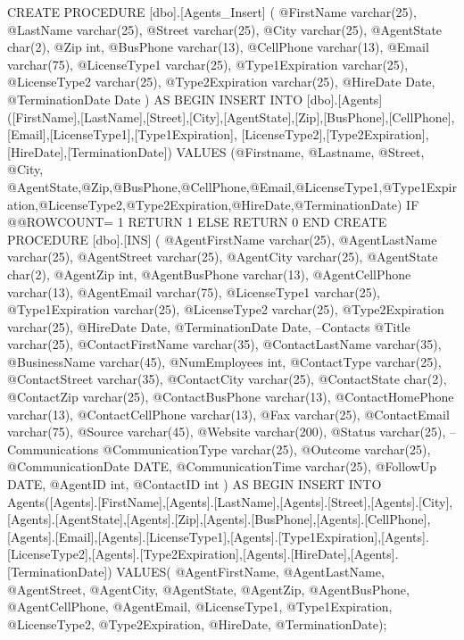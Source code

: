 CREATE PROCEDURE [dbo].[Agents_Insert]
(	
	@FirstName varchar(25),
	@LastName varchar(25),
	@Street varchar(25),
	@City varchar(25),
	@AgentState char(2),
	@Zip int,
	@BusPhone varchar(13),
	@CellPhone varchar(13),
	@Email varchar(75),
	@LicenseType1 varchar(25),
	@Type1Expiration varchar(25),
	@LicenseType2 varchar(25),
	@Type2Expiration varchar(25),
	@HireDate Date,
	@TerminationDate Date
) AS BEGIN
INSERT INTO [dbo].[Agents]
			([FirstName],[LastName],[Street],[City],[AgentState],[Zip],[BusPhone],[CellPhone],[Email],[LicenseType1],[Type1Expiration], [LicenseType2],[Type2Expiration],[HireDate],[TerminationDate])
VALUES
			(@Firstname, @Lastname, @Street, @City, @AgentState,@Zip,@BusPhone,@CellPhone,@Email,@LicenseType1,@Type1Expiration,@LicenseType2,@Type2Expiration,@HireDate,@TerminationDate)
			IF @@ROWCOUNT= 1
				RETURN 1
			ELSE
				RETURN 0
END
CREATE PROCEDURE [dbo].[INS]
(	
	@AgentFirstName varchar(25),
	@AgentLastName varchar(25),
	@AgentStreet varchar(25),
	@AgentCity varchar(25),
	@AgentState char(2),
	@AgentZip int,
	@AgentBusPhone varchar(13),
	@AgentCellPhone varchar(13),
	@AgentEmail varchar(75),
	@LicenseType1 varchar(25),
	@Type1Expiration varchar(25),
	@LicenseType2 varchar(25),
	@Type2Expiration varchar(25),
	@HireDate Date,
	@TerminationDate Date,
	--Contacts
	@Title varchar(25),
    @ContactFirstName varchar(35),
    @ContactLastName varchar(35),
    @BusinessName varchar(45),
    @NumEmployees int,
    @ContactType varchar(25),
    @ContactStreet varchar(35),
    @ContactCity varchar(25),
    @ContactState char(2),
    @ContactZip varchar(25),
    @ContactBusPhone varchar(13),
    @ContactHomePhone varchar(13),
    @ContactCellPhone varchar(13),
    @Fax varchar(25),
    @ContactEmail varchar(75),
    @Source varchar(45),
    @Website varchar(200),
    @Status varchar(25),
	--Communications
	@CommunicationType varchar(25),	
	@Outcome varchar(25),
	@CommunicationDate DATE,
	@CommunicationTime varchar(25),
	@FollowUp DATE,
	@AgentID int,
	@ContactID int
) AS BEGIN
INSERT INTO Agents([Agents].[FirstName],[Agents].[LastName],[Agents].[Street],[Agents].[City],[Agents].[AgentState],[Agents].[Zip],[Agents].[BusPhone],[Agents].[CellPhone],[Agents].[Email],[Agents].[LicenseType1],[Agents].[Type1Expiration],[Agents].[LicenseType2],[Agents].[Type2Expiration],[Agents].[HireDate],[Agents].[TerminationDate])			
	VALUES(		   @AgentFirstName,     @AgentLastName,     @AgentStreet,     @AgentCity,     @AgentState,          @AgentZip,     @AgentBusPhone,     @AgentCellPhone,     @AgentEmail,     @LicenseType1,          @Type1Expiration,          @LicenseType2,          @Type2Expiration,          @HireDate,          @TerminationDate);
